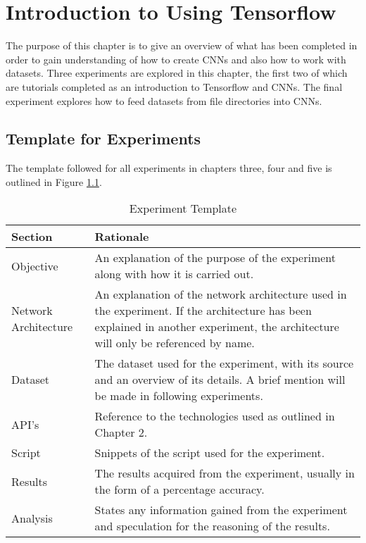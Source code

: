 \chapter{Introduction to Using Tensorflow}
The purpose of this chapter is to give an overview of what has been completed in order to gain understanding of how to create CNNs and also how to work with datasets. Three experiments are explored in this chapter, the first two of which are tutorials completed as an introduction to Tensorflow and CNNs. The final experiment explores how to feed datasets from file directories into CNNs.

\section{Template for Experiments}
The template followed for all experiments in chapters three, four and five is outlined in Figure \ref{fig:expTemplate}.

\begin{table}[]
\centering
\caption{Experiment Template}
\label{fig:expTemplate}
\begin{tabular}{|p{4cm}|p{11cm}|}
\hline
\textbf{Section}   & \textbf{Rationale}                \\ \hline
Objective             & An explanation of the purpose of the experiment along with how it is carried out. \\ \hline
Network Architecture & An explanation of the network architecture used in the experiment. If the architecture has been explained in another experiment, the architecture will only be referenced by name.                       \\ \hline
Dataset              & The dataset used for the experiment, with its source and an overview of its details. A brief mention will be made in following experiments.                       \\ \hline
API's                & Reference to the technologies used as outlined in Chapter 2.                      \\ \hline
Script               & Snippets of the script used for the experiment.                       \\ \hline
Results              & The results acquired from the experiment, usually in the form of a percentage accuracy.                       \\ \hline
Analysis   & States any information gained from the experiment and speculation for the reasoning of the results.                      \\ \hline
\end{tabular}
\end{table}

